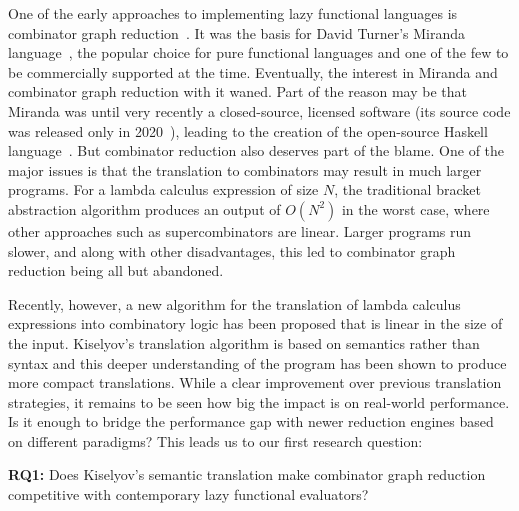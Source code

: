 \documentclass[conference]{IEEEtran}
\begin{document}
One of the early approaches to implementing lazy functional languages is combinator graph reduction~\cite{turner_new_1979}.
It was the basis for David Turner's Miranda language~\cite{turner_miranda_1985}, the popular choice for pure functional languages and one of the few to be commercially supported at the time.
Eventually, the interest in Miranda and combinator graph reduction with it waned.
Part of the reason may be that Miranda was until very recently a closed-source, licensed software (its source code was released only in 2020~\cite{noauthor_open_2021}), leading to the creation of the open-source Haskell language~\cite{hudak_history_2007}.
But combinator reduction also deserves part of the blame.
One of the major issues is that the translation to combinators may result in much larger programs.
For a lambda calculus expression of size $N$, the traditional bracket abstraction algorithm produces an output of $O(N^2)$ in the worst case, where other approaches such as supercombinators are linear\cite{spj_impl}.
Larger programs run slower, and along with other disadvantages, this led to combinator graph reduction being all but abandoned.

Recently, however, a new algorithm for the translation of lambda calculus expressions into combinatory logic has been proposed that is linear in the size of the input\cite{kiselyov_lambda_2018}.
Kiselyov's translation algorithm is based on semantics rather than syntax and this deeper understanding of the program has been shown to produce more compact translations.
While a clear improvement over previous translation strategies, it remains to be seen how big the impact is on real-world performance.
Is it enough to bridge the performance gap with newer reduction engines based on different paradigms?
This leads us to our first research question:

\textbf{RQ1:} Does Kiselyov's semantic translation make combinator graph reduction competitive with contemporary lazy functional evaluators?
\end{document}
